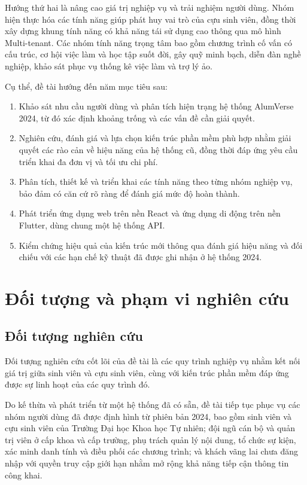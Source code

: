 \documentclass[12pt,a4paper,oneside]{report}
\begin{document}
Hướng thứ hai là nâng cao giá trị nghiệp vụ và trải nghiệm người dùng. Nhóm hiện thực hóa các tính năng giúp phát huy vai trò của cựu sinh viên, đồng thời xây dựng khung tính năng có khả năng tái sử dụng cao thông qua mô hình Multi-tenant. Các nhóm tính năng trọng tâm bao gồm chương trình cố vấn có cấu trúc, cơ hội việc làm và học tập suốt đời, gây quỹ minh bạch, diễn đàn nghề nghiệp, khảo sát phục vụ thống kê việc làm và trợ lý ảo.

Cụ thể, đề tài hướng đến năm mục tiêu sau:

\begin{enumerate}[label=(\arabic*),leftmargin=1.4cm,itemsep=2pt]
\item Khảo sát nhu cầu người dùng và phân tích hiện trạng hệ thống AlumVerse 2024, từ đó xác định khoảng trống và các vấn đề cần giải quyết.
\item Nghiên cứu, đánh giá và lựa chọn kiến trúc phần mềm phù hợp nhằm giải quyết các rào cản về hiệu năng của hệ thống cũ, đồng thời đáp ứng yêu cầu triển khai đa đơn vị và tối ưu chi phí.
\item Phân tích, thiết kế và triển khai các tính năng theo từng nhóm nghiệp vụ, bảo đảm có căn cứ rõ ràng để đánh giá mức độ hoàn thành.
\item Phát triển ứng dụng web trên nền React và ứng dụng di động trên nền Flutter, dùng chung một hệ thống API.
\item Kiểm chứng hiệu quả của kiến trúc mới thông qua đánh giá hiệu năng và đối chiếu với các hạn chế kỹ thuật đã được ghi nhận ở hệ thống 2024.
\end{enumerate}

\section{Đối tượng và phạm vi nghiên cứu}

\subsection{Đối tượng nghiên cứu}

Đối tượng nghiên cứu cốt lõi của đề tài là các quy trình nghiệp vụ nhằm kết nối giá trị giữa sinh viên và cựu sinh viên, cùng với kiến trúc phần mềm đáp ứng được sự linh hoạt của các quy trình đó.

Do kế thừa và phát triển từ một hệ thống đã có sẵn, đề tài tiếp tục phục vụ các nhóm người dùng đã được định hình từ phiên bản 2024, bao gồm sinh viên và cựu sinh viên của Trường Đại học Khoa học Tự nhiên; đội ngũ cán bộ và quản trị viên ở cấp khoa và cấp trường, phụ trách quản lý nội dung, tổ chức sự kiện, xác minh danh tính và điều phối các chương trình; và khách vãng lai chưa đăng nhập với quyền truy cập giới hạn nhằm mở rộng khả năng tiếp cận thông tin công khai.
\end{document}
